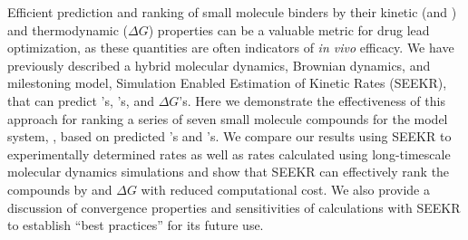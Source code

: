 
Efficient prediction and ranking of small molecule binders by their kinetic (\kon and \koff) and thermodynamic ($\Delta G$) properties can be a valuable metric for 
drug lead optimization, as these quantities are often indicators of \textit{in vivo} efficacy. 
We have 
previously described a hybrid molecular dynamics, Brownian dynamics, and milestoning model, Simulation Enabled Estimation of Kinetic 
Rates (SEEKR), that can predict \kon's, \koff's, and $\Delta G$'s. Here we demonstrate the effectiveness of this approach for ranking a 
series of seven small molecule compounds for the model system, \bcd, based on predicted \kon's and \koff's. We compare our results using 
SEEKR to experimentally determined rates as well as rates calculated using long-timescale molecular dynamics simulations and show that 
SEEKR can effectively rank the compounds by \koff and $\Delta G$ with reduced computational cost. We also provide a discussion of 
convergence properties and sensitivities of calculations with SEEKR to establish ``best practices'' for its future use.


